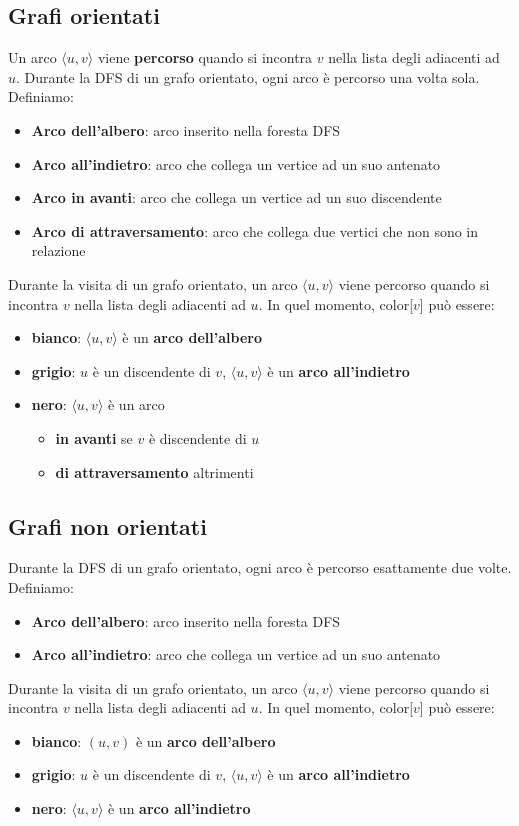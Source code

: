 \documentclass[11pt]{article}
\theoremstyle{proprietà}
\begin{document}
\subsection{Grafi orientati}
Un arco $\langle u,v \rangle$ viene \textbf{percorso} quando si incontra $v$ nella lista degli adiacenti ad $u$. Durante 
la DFS di un grafo orientato, ogni arco è percorso una volta sola. Definiamo:
\begin{itemize}
    \item \textbf{Arco dell'albero}: arco inserito nella foresta DFS
    \item \textbf{Arco all'indietro}: arco che collega un vertice ad un suo antenato
    \item \textbf{Arco in avanti}: arco che collega un vertice ad un suo discendente 
    \item \textbf{Arco di attraversamento}: arco che collega due vertici che non sono in relazione 
\end{itemize}
Durante la visita di un grafo orientato, un arco $\langle u,v \rangle$ viene percorso quando si incontra $v$ nella lista 
degli adiacenti ad $u$. In quel momento, color[$v$] può essere:
\begin{itemize}
    \item \textbf{bianco}: $\langle u,v \rangle$ è un \textbf{arco dell'albero}
    \item \textbf{grigio}: $u$ è un discendente di $v$, $\langle u,v \rangle$ è un \textbf{arco all'indietro} 
    \item \textbf{nero}: $\langle u,v \rangle$ è un arco
    \begin{itemize}
        \item \textbf{in avanti} se $v$ è discendente di $u$
        \item \textbf{di attraversamento} altrimenti
    \end{itemize}
\end{itemize}
\subsection{Grafi non orientati}
Durante la DFS di un grafo orientato, ogni arco è percorso esattamente due volte. Definiamo:
\begin{itemize}
    \item \textbf{Arco dell'albero}: arco inserito nella foresta DFS
    \item \textbf{Arco all'indietro}: arco che collega un vertice ad un suo antenato
\end{itemize}
Durante la visita di un grafo orientato, un arco $\langle u,v \rangle$ viene percorso quando si incontra $v$ nella lista 
degli adiacenti ad $u$. In quel momento, color[$v$] può essere:
\begin{itemize}
    \item \textbf{bianco}: $(u,v)$ è un \textbf{arco dell'albero}
    \item \textbf{grigio}: $u$ è un discendente di $v$, $\langle u,v \rangle$ è un \textbf{arco all'indietro} 
    \item \textbf{nero}: $\langle u,v \rangle$ è un \textbf{arco all'indietro}
\end{itemize}
\end{document}
